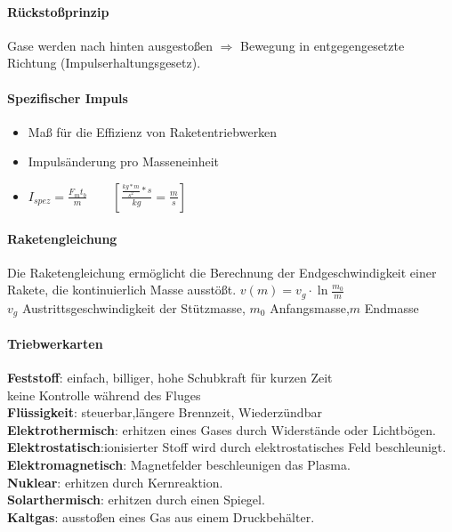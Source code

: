 \documentclass[12pt,a4paper]{article}
\author{Robin Brase}
\begin{document}
\paragraph{Rückstoßprinzip}
\begin{flushleft}
Gase werden nach hinten ausgestoßen $\Rightarrow $ Bewegung in entgegengesetzte Richtung (Impulserhaltungsgesetz).
\end{flushleft}
\paragraph{Spezifischer Impuls}
\begin{flushleft}
\begin{itemize}
\item Maß für die Effizienz von Raketentriebwerken
\item Impulsänderung pro Masseneinheit
\item $I_{spez} = \frac{F_mt_b}{m} \qquad[\frac{\frac{kg*m}{s^2}*s}{kg} = \frac{m}{s}]$
\end{itemize}
\end{flushleft}
\paragraph{Raketengleichung}
\begin{flushleft}
Die Raketengleichung ermöglicht die Berechnung der Endgeschwindigkeit einer Rakete, die kontinuierlich Masse ausstößt.
$v(m) = v_g \cdot \ln \frac{m_0}{m}$\\
$v_g$ Austrittsgeschwindigkeit der Stützmasse, $m_0$ Anfangsmasse,$m$ Endmasse
\end{flushleft}
\paragraph{Triebwerkarten}
\begin{flushleft}
\textbf{Feststoff}: einfach, billiger, hohe Schubkraft für kurzen Zeit\\ keine Kontrolle während des Fluges\\
\textbf{Flüssigkeit}: steuerbar,längere Brennzeit, Wiederzündbar\\
\textbf{Elektrothermisch}: erhitzen eines Gases durch Widerstände oder Lichtbögen.\\
\textbf{Elektrostatisch}:ionisierter Stoff wird durch elektrostatisches Feld beschleunigt.\\
\textbf{Elektromagnetisch}: Magnetfelder beschleunigen das Plasma.\\
\textbf{Nuklear}: erhitzen durch Kernreaktion.\\
\textbf{Solarthermisch}: erhitzen durch einen Spiegel.\\
\textbf{Kaltgas}: ausstoßen eines Gas aus einem Druckbehälter.\\
\end{flushleft}
\end{document}
